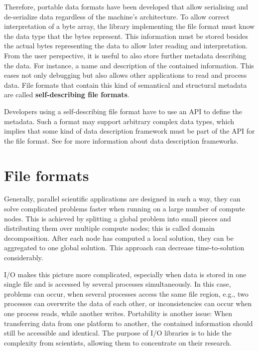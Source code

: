 Therefore, portable data formats have been developed that allow serialising and de-serialize data regardless of the machine's architecture.
To allow correct interpretation of a byte array, the library implementing the file format must know the data type that the bytes represent.
This information must be stored besides the actual bytes representing the data to allow later reading and interpretation.
From the user perspective, it is useful to also store further metadata describing the data.
For instance, a name and description of the contained information.
This eases not only debugging but also allows other applications to read and process data.
File formats that contain this kind of semantical and structural metadata are called \textbf{self-describing file formats}.

Developers using a self-describing file format have to use an API to define the metadata.
Such a format may support arbitrary complex data types, which implies that some kind of data description framework must be part of the API for the file format.
See  for more information about data description frameworks.


\section{File formats}
\label{sec: background/file formats}


Generally, parallel scientific applications are designed in such a way, they can solve complicated problems faster when running on a large number of compute nodes.
This is achieved by splitting a global problem into small pieces and distributing them over multiple compute nodes; this is called domain decomposition.
After each node has computed a local solution, they can be aggregated to one global solution.
This approach can decrease time-to-solution considerably.

I/O makes this picture more complicated, especially when data is stored in one single file and is accessed by several processes simultaneously.
In this case, problems can occur, when several processes access the same file region, e.g., two processes can overwrite the data of each other, or inconsistencies can occur when one process reads, while another writes.
Portability is another issue: When transferring data from one platform to another, the contained information should still be accessible and identical.
The purpose of I/O libraries is to hide the complexity from scientists, allowing them to concentrate on their research.



